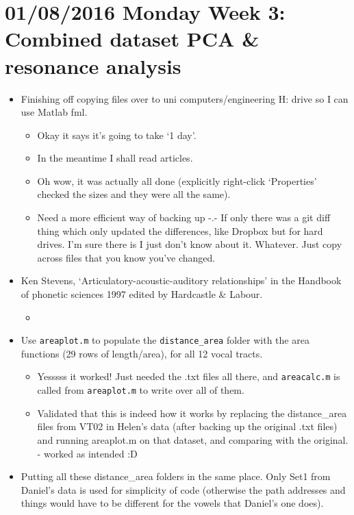 \documentclass{article}
\begin{document}
\section*{01/08/2016 Monday Week 3: Combined dataset PCA \& resonance analysis}
\begin{itemize}
    \item Finishing off copying files over to uni computers/engineering H: drive so I can use Matlab fml.
    \begin{itemize}
        \item Okay it says it's going to take `1 day'.
        \item In the meantime I shall read articles.
        \item Oh wow, it was actually all done (explicitly right-click `Properties' checked the sizes and they were all the same).
        \item Need a more efficient way of backing up -.- If only there was a git diff thing which only updated the differences, like Dropbox but for hard drives. I'm sure there is I just don't know about it. Whatever. Just copy across files that you know you've changed.
    \end{itemize}
    \item Ken Stevens, `Articulatory-acoustic-auditory relationships' in the Handbook of phonetic sciences 1997 edited by Hardcastle \& Labour.
    \begin{itemize}
        \item 
    \end{itemize}
    \item Use \verb|areaplot.m| to populate the \verb|distance_area| folder with the area functions (29 rows of length/area), for all 12 vocal tracts.
    \begin{itemize}
        \item Yesssss it worked! Just needed the .txt files all there, and \verb|areacalc.m| is called from \verb|areaplot.m| to write over all of them.
        \item Validated that this is indeed how it works by replacing the distance\_area files from VT02 in Helen's data (after backing up the original .txt files) and running areaplot.m on that dataset, and comparing with the original. - worked as intended :D
    \end{itemize}
    \item Putting all these distance\_area folders in the same place. Only Set1 from Daniel's data is used for simplicity of code (otherwise the path addresses and things would have to be different for the vowels that Daniel's one does).

\end{itemize}
\end{document}
